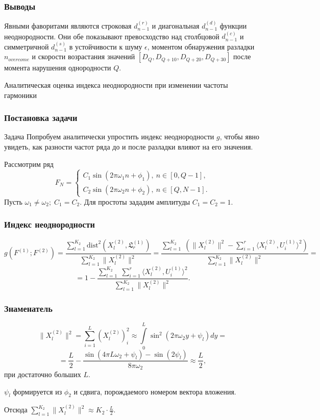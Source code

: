 \documentclass[11pt]{beamer}
\begin{document}
	\begin{frame}
		\frametitle{Выводы}
		Явными фаворитами являются строковая $d_{n-1}^{(r)}$ и диагональная $d_{n-1}^{(d)}$ функции неоднородности. Они обе показывают превосходство над столбцовой $d_{n-1}^{(c)}$ и симметричной $d_{n-1}^{(s)}$ в устойчивости к шуму $\epsilon$, моментом обнаружения разладки $n_{overcome}$ и скорости возрастания значений $[D_Q, D_{Q+10}, D_{Q+20}, D_{Q+30}]$ после момента нарушения однородности $Q$.
	\end{frame}



	\begin{frame}
		\centering
		Аналитическая оценка индекса неоднородности при изменении частоты гармоники
	\end{frame}

	\begin{frame}
		\frametitle{Постановка задачи}
		\begin{block}{Задача}
			Попробуем аналитически упростить индекс неоднородности $ g $, чтобы явно увидеть, как разности частот ряда до и после разладки влияют на его значения.
		\end{block}
		Рассмотрим ряд
		\begin{equation*} 
			F_N = 
			\begin{cases} 
				C_1\sin(2\pi\omega_1 n + \phi_1),\ n \in [0, Q-1], \\ 
				C_2\sin(2\pi\omega_2 n + \phi_2),\ n \in [Q, N-1]. 
			\end{cases} 
		\end{equation*} 
		Пусть $ \omega_1 \neq \omega_2;\; C_1 = C_2 $. Для простоты зададим амплитуды $ C_1 = C_2 = 1 $.
	\end{frame}


	\begin{frame}
		\frametitle{Индекс неоднородности}
		$$ g(F^{(1)}; F^{(2)}) = \frac{\sum\limits_{l=1}^{K_2}\mathrm{dist}^2(X_l^{(2)}, \mathfrak{L}_r^{(1)})}{\sum\limits_{l=1}^{K_2}\|X_l^{(2)}\|^2} = \frac{\sum\limits_{l=1}^{K_2}\;(\|X_l^{(2)}\|^2 - \sum\limits_{i=1}^{r}\langle X_l^{(2)}, U_i^{(1)}\rangle^2)}{\sum\limits_{l=1}^{K_2}\|X_l^{(2)}\|^2} = $$
		$$ = 1 - \frac{\sum\limits_{l=1}^{K_2}\;\sum\limits_{i=1}^{r}\langle X_l^{(2)}, U_i^{(1)}\rangle^2}{\sum\limits_{l=1}^{K_2}\|X_l^{(2)}\|^2}. $$
	\end{frame}


	\begin{frame}
		\frametitle{Знаменатель}
		$$ \|X_l^{(2)}\|^2 = \sum\limits_{i=1}^{L}(X_{l}^{(2)})_i^2 \approx \int\limits_{0}^{L}\sin^2{(2\pi\omega_2 y + \psi_l)}dy = $$
		$$ = \frac{L}{2} - \frac{\sin(4\pi L\omega_2 + \psi_l) - \sin(2\psi_l)}{8\pi\omega_2} \approx \frac{L}{2}, $$
		при достаточно больших $ L $. 
		
		$ \psi_l $ формируется из $ \phi_2 $ и сдвига, порождаемого номером вектора вложения.
		
		Отсюда $\sum\limits_{l=1}^{K_2}\|X_l^{(2)}\|^2 \approx K_2\cdot\frac{L}{2}$.
	\end{frame}
\end{document}
